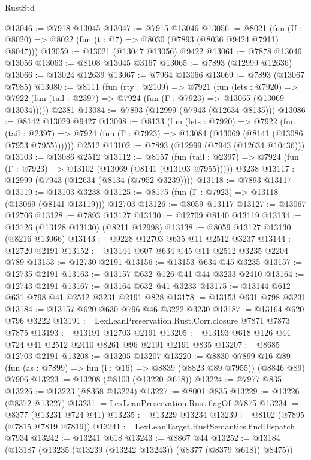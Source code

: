 \begin{lexlean}{RustStd}
\begin{coremodule}
{\begin{coremodule}
{{{{{{{{{{{{{{{{{{{{{{{{{{{{{{{{{{{{{{{{{{{{{{{{{{@13046 := @7918 @13045
@13047 := @7915 @13046
@13056 := @8021 (fun (U : @8020) => @8022 (fun (t : @7) => @8030 (@7893 (@8036 @9424 @7911) @8047)))
@13059 := @13021 (@13047 @13056) @9422
@13061 := @7878 @13046 @13056
@13063 := @8108 @13045 @3167
@13065 := @7893 (@12999 @12636)
@13066 := @13024 @12639
@13067 := @7964 @13066
@13069 := @7893 (@13067 @7985)
@13080 := @8111
    (fun (rty : @2109) =>
    @7921
      (fun (lets : @7920) =>
      @7922 (fun (tail : @2397) => @7924 (fun (Γ : @7923) => @13065 (@13069 @13034)))))
    @2381
@13084 := @7893 (@12999 (@7943 (@12634 @8135)))
@13086 := @8142 @13029 @9427
@13098 := @8133
    (fun (lets : @7920) =>
    @7922
      (fun (tail : @2397) =>
      @7924 (fun (Γ : @7923) => @13084 (@13069 (@8141 (@13086 @7953 @7955))))))
    @2512
@13102 := @7893 (@12999 (@7943 (@12634 @10436)))
@13103 := @13086 @2512
@13112 := @8157
    (fun (tail : @2397) => @7924 (fun (Γ : @7923) => @13102 (@13069 (@8141 (@13103 @7955)))))
    @3238
@13117 := @12999 (@7943 (@12634 (@8134 (@7952 @3239))))
@13118 := @7893 @13117
@13119 := @13103 @3238
@13125 := @8175 (fun (Γ : @7923) => @13118 (@13069 (@8141 @13119))) @12703
@13126 := @8059 @13117
@13127 := @13067 @12706
@13128 := @7893 @13127
@13130 := @12709 @8140 @13119
@13134 := @13126 (@13128 @13130) (@8211 @12998)
@13138 := @8059 @13127 @13130 (@8216 @13066)
@13143 := @9228 @12703 @635 @11 @2512 @3237
@13144 := @12720 @2191
@13152 := @13144 @607 @634 @45 @11 @2512 @3235 @2204 @789
@13153 := @12730 @2191
@13156 := @13153 @634 @45 @3235
@13157 := @12735 @2191
@13163 := @13157 @632 @126 @41 @44 @3233 @2410
@13164 := @12743 @2191
@13167 := @13164 @632 @41 @3233
@13175 := @13144 @612 @631 @798 @41 @2512 @3231 @2191 @828
@13178 := @13153 @631 @798 @3231
@13184 := @13157 @620 @630 @796 @46 @3222 @3230
@13187 := @13164 @620 @796 @3222
@13191 := LexLeanPreservation.Rust.Corr.closure @7871 @7873 @7875
@13193 := @13191 @12703 @2191
@13205 := @13193 @618 @126 @44 @724 @41 @2512 @2410 @8261 @96 @2191 @2191 @835
@13207 := @8685 @12703 @2191
@13208 := @13205 @13207
@13220 := @8830
    @7899
    @16
    @89
    (fun (as : @7899) => fun (i : @16) => @8839 (@8823 @89 @7955))
    (@8846 @89)
    @7906
@13223 := @13208 (@8103 (@13220 @618))
@13224 := @7977 @835
@13226 := @13223 (@8368 @13224)
@13227 := @8001 @835
@13229 := @13226 (@8372 @13227)
@13231 := LexLeanPreservation.Rust.flagOf @7875
@13234 := @8377 (@13231 @724 @41)
@13235 := @13229 @13234
@13239 := @8102 (@7895 (@7815 @7819 @7819))
@13241 := LexLeanTarget.RustSemantics.findDispatch @7934
@13242 := @13241 @618
@13243 := @8867 @44
@13252 := @13184 (@13187 (@13235 (@13239 (@13242 @13243)) (@8377 (@8379 @618)) @8475))
}}}}}}}}}}}}}}}}}}}}}}}}}}}}}}}}}}}}}}}}}}}}}}}}}}
\end{coremodule}}
\end{coremodule}
\end{lexlean}
